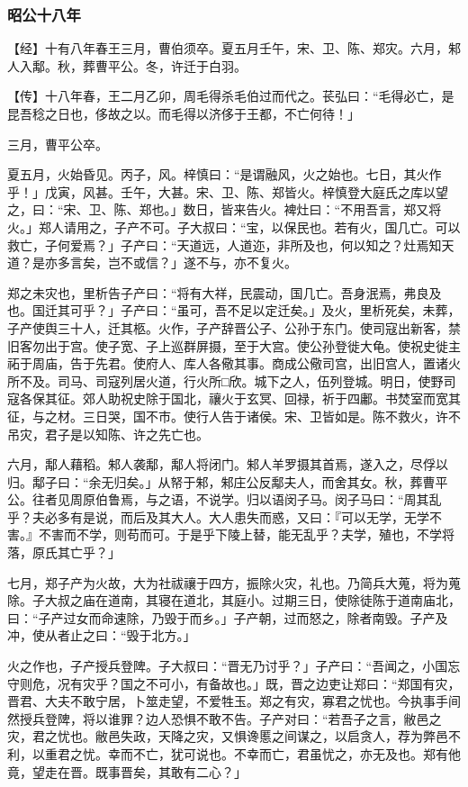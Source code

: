 \documentclass[]{article}
\begin{document}
\hypertarget{header-n2659}{%
\subsubsection{昭公十八年}\label{header-n2659}}

【经】十有八年春王三月，曹伯须卒。夏五月壬午，宋、卫、陈、郑灾。六月，邾人入鄅。秋，葬曹平公。冬，许迁于白羽。

【传】十八年春，王二月乙卯，周毛得杀毛伯过而代之。苌弘曰：``毛得必亡，是昆吾稔之日也，侈故之以。而毛得以济侈于王都，不亡何待！」

三月，曹平公卒。

夏五月，火始昏见。丙子，风。梓慎曰：``是谓融风，火之始也。七日，其火作乎！」戊寅，风甚。壬午，大甚。宋、卫、陈、郑皆火。梓慎登大庭氏之库以望之，曰：``宋、卫、陈、郑也。」数日，皆来告火。裨灶曰：``不用吾言，郑又将火。」郑人请用之，子产不可。子大叔曰：``宝，以保民也。若有火，国几亡。可以救亡，子何爱焉？」子产曰：``天道远，人道迩，非所及也，何以知之？灶焉知天道？是亦多言矣，岂不或信？」遂不与，亦不复火。

郑之未灾也，里析告子产曰：``将有大祥，民震动，国几亡。吾身泯焉，弗良及也。国迁其可乎？」子产曰：``虽可，吾不足以定迁矣。」及火，里析死矣，未葬，子产使舆三十人，迁其柩。火作，子产辞晋公子、公孙于东门。使司寇出新客，禁旧客勿出于宫。使子宽、子上巡群屏摄，至于大宫。使公孙登徙大龟。使祝史徙主祏于周庙，告于先君。使府人、库人各儆其事。商成公儆司宫，出旧宫人，置诸火所不及。司马、司寇列居火道，行火所□欣。城下之人，伍列登城。明日，使野司寇各保其征。郊人助祝史除于国北，禳火于玄冥、回禄，祈于四鄘。书焚室而宽其征，与之材。三日哭，国不市。使行人告于诸侯。宋、卫皆如是。陈不救火，许不吊灾，君子是以知陈、许之先亡也。

六月，鄅人藉稻。邾人袭鄅，鄅人将闭门。邾人羊罗摄其首焉，遂入之，尽俘以归。鄅子曰：``余无归矣。」从帑于邾，邾庄公反鄅夫人，而舍其女。秋，葬曹平公。往者见周原伯鲁焉，与之语，不说学。归以语闵子马。闵子马曰：``周其乱乎？夫必多有是说，而后及其大人。大人患失而惑，又曰：『可以无学，无学不害。』不害而不学，则苟而可。于是乎下陵上替，能无乱乎？夫学，殖也，不学将落，原氏其亡乎？」

七月，郑子产为火故，大为社祓禳于四方，振除火灾，礼也。乃简兵大蒐，将为蒐除。子大叔之庙在道南，其寝在道北，其庭小。过期三日，使除徒陈于道南庙北，曰：``子产过女而命速除，乃毁于而乡。」子产朝，过而怒之，除者南毁。子产及冲，使从者止之曰：``毁于北方。」

火之作也，子产授兵登陴。子大叔曰：``晋无乃讨乎？」子产曰：``吾闻之，小国忘守则危，况有灾乎？国之不可小，有备故也。」既，晋之边吏让郑曰：``郑国有灾，晋君、大夫不敢宁居，卜筮走望，不爱牲玉。郑之有灾，寡君之忧也。今执事手间然授兵登陴，将以谁罪？边人恐惧不敢不告。子产对曰：``若吾子之言，敝邑之灾，君之忧也。敝邑失政，天降之灾，又惧谗慝之间谋之，以启贪人，荐为弊邑不利，以重君之忧。幸而不亡，犹可说也。不幸而亡，君虽忧之，亦无及也。郑有他竟，望走在晋。既事晋矣，其敢有二心？」
\end{document}

